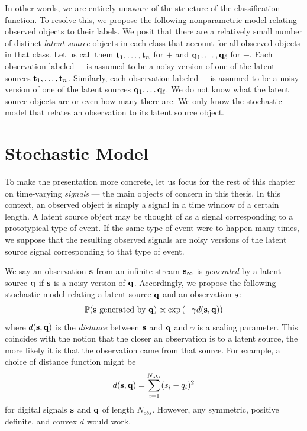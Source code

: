 In other words, we are entirely unaware of the structure of the classification
function. To resolve this, we propose the following nonparametric model relating
observed objects to their labels. We posit that there are a relatively small
number of distinct {\em latent source} objects in each class that account for
all observed objects in that class. Let us call them $\mathbf t_1, \dots, \mathbf t_n$
for $+$ and $\mathbf q_1, \dots, \mathbf q_{\ell}$ for $-$. Each observation labeled $+$
is assumed to be a noisy version of one of the latent sources $\mathbf t_1, \dots,
\mathbf t_n$. Similarly, each observation labeled $-$ is assumed to be a noisy
version of one of the latent sources $\mathbf q_1, \dots \mathbf q_{\ell}$. We do not
know what the latent source objects are or even how many there are. We only know
the stochastic model that relates an observation to its latent source object.

\section{Stochastic Model}
To make the presentation more concrete, let us focus for the rest of this
chapter on time-varying {\em signals} --- the main objects of concern in this
thesis. In this context, an observed object is simply a signal in a time window
of a certain length.  A latent source object may be thought of as a signal
corresponding to a prototypical type of event. If the same type of event were to
happen many times, we suppose that the resulting observed signals are noisy
versions of the latent source signal corresponding to that type of event.

We say an observation $\mathbf s$ from an infinite stream $\mathbf s_{\infty}$ is {\em
  generated} by a latent source $\mathbf q$ if $\mathbf s$ is a noisy version of $\mathbf
q$. Accordingly, we propose the following stochastic model relating a latent
source $\mathbf q$ and an observation $\mathbf s$:
\begin{gather}
\mathbb{P}(\mathbf s \text{ generated by } \mathbf q) \propto \exp\left(-\gamma d(\mathbf s,\mathbf q) \right)
\end{gather}
where $d(\mathbf s, \mathbf q)$ is the {\em distance} between $\mathbf s$ and $\mathbf q$ and $\gamma$ is a
scaling parameter. This coincides with the notion that the closer an observation
is to a latent source, the more likely it is that the observation came from that
source. For example, a choice of distance function might be
\begin{gather}
d(\mathbf s,\mathbf q) = \sum_{i=1}^{N_{obs}} (s_i - q_i)^2
\end{gather}
for digital signals $\mathbf s$ and $\mathbf q$ of length $N_{obs}$. However, any
symmetric, positive definite, and convex $d$ would work.

